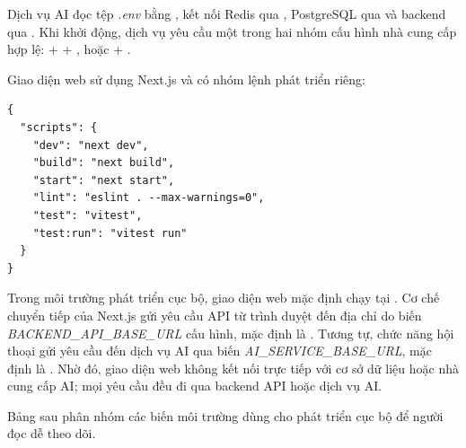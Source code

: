 Dịch vụ AI đọc tệp \textit{.env} bằng , kết nối Redis qua , PostgreSQL qua  và backend qua . Khi khởi động, dịch vụ yêu cầu một trong hai nhóm cấu hình nhà cung cấp hợp lệ:  +  + , hoặc  + .

Giao diện web sử dụng Next.js và có nhóm lệnh phát triển riêng:

\begin{lstlisting}
{
  "scripts": {
    "dev": "next dev",
    "build": "next build",
    "start": "next start",
    "lint": "eslint . --max-warnings=0",
    "test": "vitest",
    "test:run": "vitest run"
  }
}
\end{lstlisting}

Trong môi trường phát triển cục bộ, giao diện web mặc định chạy tại . Cơ chế chuyển tiếp của Next.js gửi yêu cầu API từ trình duyệt đến địa chỉ do biến \textit{BACKEND\_API\_BASE\_URL} cấu hình, mặc định là . Tương tự, chức năng hội thoại gửi yêu cầu đến dịch vụ AI qua biến \textit{AI\_SERVICE\_BASE\_URL}, mặc định là . Nhờ đó, giao diện web không kết nối trực tiếp với cơ sở dữ liệu hoặc nhà cung cấp AI; mọi yêu cầu đều đi qua backend API hoặc dịch vụ AI.

Bảng sau phân nhóm các biến môi trường dùng cho phát triển cục bộ để người đọc dễ theo dõi.

